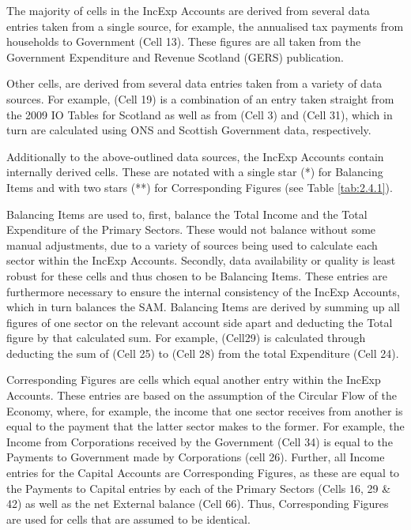 \bigskip

The majority of cells in the IncExp Accounts are derived from several data entries taken from a single source, for example, the annualised tax payments from households to Government (Cell 13). These figures are all taken from the Government Expenditure and Revenue Scotland (GERS) publication. 

\bigskip

Other cells, are derived from several data entries taken from a variety of data sources. For example, (Cell 19) is a combination of an entry taken straight from the 2009 IO Tables for Scotland as well as from (Cell 3) and (Cell 31), which in turn are calculated using ONS and Scottish Government data, respectively.

\bigskip

Additionally to the above-outlined data sources, the IncExp Accounts contain internally derived cells. These are notated with a single star (*) for Balancing Items and with two stars (**) for Corresponding Figures (see Table \ref{tab:2.4.1}). 

\bigskip

Balancing Items are used to, first, balance the Total Income and the Total Expenditure of the Primary Sectors. These would not balance without some manual adjustments, due to a variety of sources being used to calculate each sector within the IncExp Accounts. Secondly, data availability or quality is least robust for these cells and thus chosen to be Balancing Items. These entries are furthermore necessary to ensure the internal consistency of the IncExp Accounts, which in turn balances the SAM. Balancing Items are derived by summing up all figures of one sector on the relevant account side apart  and deducting the Total figure by that calculated sum. For example, (Cell29) is calculated through deducting the sum of (Cell 25) to (Cell 28) from the total Expenditure (Cell 24).

\bigskip

Corresponding Figures are cells which equal another entry within the IncExp Accounts. These entries are based on the assumption of the Circular Flow of the Economy, where, for example, the income that one sector receives from another is equal to the payment that the latter sector makes to the former. For example, the Income from Corporations received by the Government (Cell 34) is equal to the Payments to Government made by Corporations (cell 26). Further, all Income entries for the Capital Accounts are Corresponding Figures, as these are equal to the Payments to Capital entries by each of the Primary Sectors (Cells 16, 29 \& 42) as well as the net External balance (Cell 66).
Thus, Corresponding Figures are used for cells that are assumed to be identical.

